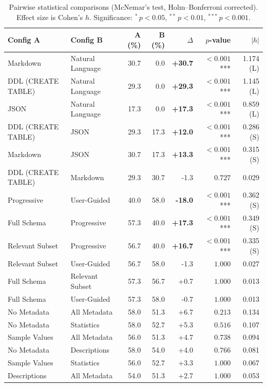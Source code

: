 \begin{table}[t]
\centering
\caption{Pairwise statistical comparisons (McNemar's test, Holm--Bonferroni corrected). Effect size is Cohen's $h$. Significance: $^{*}\,p<0.05$, $^{**}\,p<0.01$, $^{***}\,p<0.001$.}
\label{tab:statistical_significance}
\footnotesize
\begin{tabular}{llrrrrr}
\toprule
Config A & Config B & A (\%) & B (\%) & $\Delta$ & $p$-value & $|h|$ \\
\midrule
Markdown & Natural Language & 30.7 & 0.0 & \textbf{+30.7} & $< 0.001$*** & 1.174 (L) \\
DDL (CREATE TABLE) & Natural Language & 29.3 & 0.0 & \textbf{+29.3} & $< 0.001$*** & 1.145 (L) \\
JSON & Natural Language & 17.3 & 0.0 & \textbf{+17.3} & $< 0.001$*** & 0.859 (L) \\
DDL (CREATE TABLE) & JSON & 29.3 & 17.3 & \textbf{+12.0} & $< 0.001$*** & 0.286 (S) \\
Markdown & JSON & 30.7 & 17.3 & \textbf{+13.3} & $< 0.001$*** & 0.315 (S) \\
DDL (CREATE TABLE) & Markdown & 29.3 & 30.7 & -1.3 & $0.727$ & 0.029 \\
Progressive & User-Guided & 40.0 & 58.0 & \textbf{-18.0} & $< 0.001$*** & 0.362 (S) \\
Full Schema & Progressive & 57.3 & 40.0 & \textbf{+17.3} & $< 0.001$*** & 0.349 (S) \\
Relevant Subset & Progressive & 56.7 & 40.0 & \textbf{+16.7} & $< 0.001$*** & 0.335 (S) \\
Relevant Subset & User-Guided & 56.7 & 58.0 & -1.3 & $1.000$ & 0.027 \\
Full Schema & Relevant Subset & 57.3 & 56.7 & +0.7 & $1.000$ & 0.013 \\
Full Schema & User-Guided & 57.3 & 58.0 & -0.7 & $1.000$ & 0.013 \\
No Metadata & All Metadata & 58.0 & 51.3 & +6.7 & $0.213$ & 0.134 \\
No Metadata & Statistics & 58.0 & 52.7 & +5.3 & $0.516$ & 0.107 \\
Sample Values & All Metadata & 56.0 & 51.3 & +4.7 & $0.738$ & 0.094 \\
No Metadata & Descriptions & 58.0 & 54.0 & +4.0 & $0.766$ & 0.081 \\
Sample Values & Statistics & 56.0 & 52.7 & +3.3 & $1.000$ & 0.067 \\
Descriptions & All Metadata & 54.0 & 51.3 & +2.7 & $1.000$ & 0.053 \\

\end{tabular}
\end{table}
